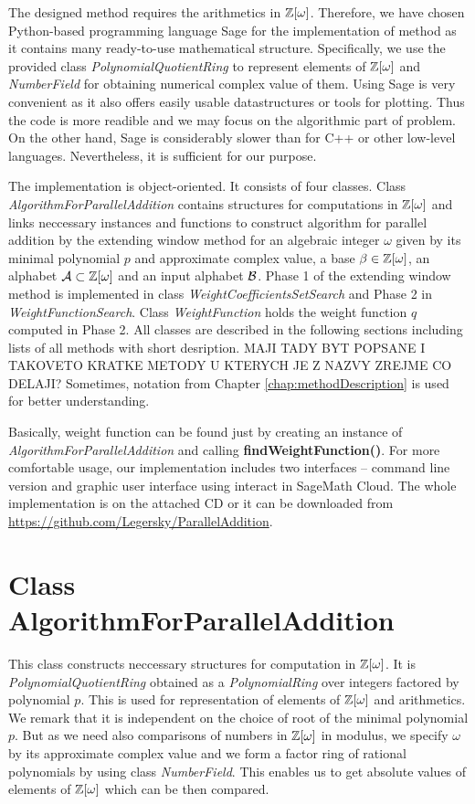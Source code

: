 The designed method requires the arithmetics in $\mathbb{Z}[\omega]$. Therefore, we have chosen Python-based programming language Sage for the implementation of method as it contains many ready-to-use mathematical structure. Specifically, we use the provided class \emph{PolynomialQuotientRing} to represent elements of $\mathbb{Z}[\omega]$ and  \emph{NumberField} for obtaining numerical complex value of them. Using Sage is very convenient as it also offers easily usable datastructures or tools for plotting. Thus the code is more readible and we may focus on the algorithmic part of problem. On the other hand, Sage is considerably slower than for C++ or other low-level languages. Nevertheless, it is sufficient for our purpose.

The implementation is object-oriented. It consists of four classes. Class \emph{AlgorithmForParallelAddition} contains structures for computations in $\mathbb{Z}[\omega]$ and links neccessary instances and functions to construct algorithm for parallel addition by the extending window method for an algebraic integer $\omega$ given by its minimal polynomial $p$ and approximate complex value, a base $\beta\in\mathbb{Z}[\omega]$, an alphabet $\mathcal{A}\subset\mathbb{Z}[\omega]$ and an input alphabet $\mathcal{B}$. Phase 1 of the extending window method is implemented in class \emph{WeightCoefficientsSetSearch} and Phase 2 in \emph{WeightFunctionSearch}. Class \emph{WeightFunction} holds the weight function $q$ computed in Phase 2. All classes are described in the following sections including lists of all methods  with short desription.
MAJI TADY BYT POPSANE I TAKOVETO KRATKE METODY U KTERYCH JE Z NAZVY ZREJME CO DELAJI? Sometimes, notation from Chapter \ref{chap:methodDescription} is used for better understanding.

Basically, weight function can be found just by creating an instance of \emph{AlgorithmForParallelAddition} and calling \textbf{findWeightFunction()}. For more comfortable usage, our implementation includes two interfaces -- command line version and graphic user interface using interact in SageMath Cloud. The whole implementation is on the attached CD or it can be downloaded from  \url{https://github.com/Legersky/ParallelAddition}.

\section{Class AlgorithmForParallelAddition}
This class constructs neccessary structures for computation in $\mathbb{Z}[\omega]$. It is \emph{PolynomialQuotientRing} obtained as a \emph{PolynomialRing} over integers factored by polynomial $p$. This is used for representation of elements of $\mathbb{Z}[\omega]$ and arithmetics. We remark that it is independent on the choice of root of the  minimal polynomial $p$. But as we need also comparisons of numbers in $\mathbb{Z}[\omega]$ in modulus, we specify $\omega$ by its approximate complex value and we form a factor ring of rational polynomials by using class \emph{NumberField}. This enables us to get absolute values of elements of $\mathbb{Z}[\omega]$ which can be then compared.

